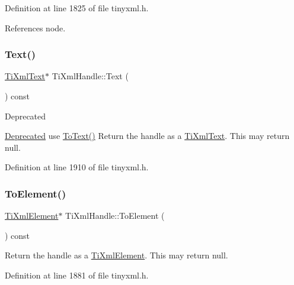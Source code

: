 Definition at line 1825 of file tinyxml.\+h.



References node.

\hypertarget{class_ti_xml_handle_ad3b502c72059421e4dfcc7bda3c392fe}{}\label{class_ti_xml_handle_ad3b502c72059421e4dfcc7bda3c392fe} 
\subsubsection{\texorpdfstring{Text()}{Text()}}
{\footnotesize\ttfamily \hyperlink{class_ti_xml_text}{Ti\+Xml\+Text}$\ast$ Ti\+Xml\+Handle\+::\+Text (\begin{DoxyParamCaption}{ }\end{DoxyParamCaption}) const\hspace{0.3cm}{\ttfamily [inline]}}

\begin{DoxyRefDesc}{Deprecated}
\item[\hyperlink{deprecated__deprecated000004}{Deprecated}]use \hyperlink{class_ti_xml_handle_abde286bce1d5db0d20ec30e573278cdf}{To\+Text()} Return the handle as a \hyperlink{class_ti_xml_text}{Ti\+Xml\+Text}. This may return null. \end{DoxyRefDesc}


Definition at line 1910 of file tinyxml.\+h.

\hypertarget{class_ti_xml_handle_a0e3a5333550237d899b1df2b965611a1}{}\label{class_ti_xml_handle_a0e3a5333550237d899b1df2b965611a1} 
\subsubsection{\texorpdfstring{To\+Element()}{ToElement()}}
{\footnotesize\ttfamily \hyperlink{class_ti_xml_element}{Ti\+Xml\+Element}$\ast$ Ti\+Xml\+Handle\+::\+To\+Element (\begin{DoxyParamCaption}{ }\end{DoxyParamCaption}) const\hspace{0.3cm}{\ttfamily [inline]}}

Return the handle as a \hyperlink{class_ti_xml_element}{Ti\+Xml\+Element}. This may return null. 

Definition at line 1881 of file tinyxml.\+h.

